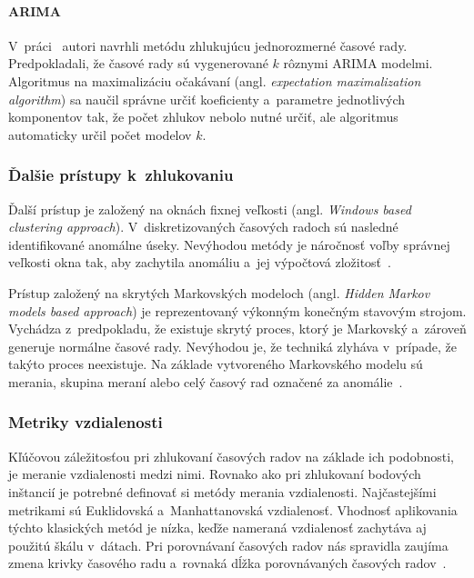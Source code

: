 \documentclass[a4paper,twoside,slovak,12pt,appendix]{article}
\begin{document}
\paragraph{ARIMA}
V~práci~\cite{Xiong2002} autori navrhli metódu zhlukujúcu jednorozmerné časové
rady. Predpokladali, že časové rady sú vygenerované $k$ rôznymi ARIMA modelmi.
Algoritmus na maximalizáciu očakávaní (angl. \textit{expectation maximalization
algorithm}) sa naučil správne určiť koeficienty a~parametre jednotlivých
komponentov tak, že počet zhlukov nebolo nutné určiť, ale algoritmus automaticky
určil počet modelov $k$.

\subsubsection{Ďalšie prístupy k~zhlukovaniu}
Ďalší prístup je založený na oknách fixnej veľkosti (angl. \textit{Windows based
clustering approach}). V~diskretizovaných časových radoch sú nasledné
identifikované anomálne úseky. Nevýhodou metódy je náročnosť voľby správnej
veľkosti okna tak, aby zachytila anomáliu a~jej výpočtová
zložitosť~\cite{Teng2010}.

Prístup založený na skrytých Markovských modeloch (angl. \textit{Hidden Markov
models based approach}) je reprezentovaný výkonným konečným stavovým strojom.
Vychádza z~predpokladu, že existuje skrytý proces, ktorý je Markovský a~zároveň
generuje normálne časové rady. Nevýhodou je, že techniká zlyháva v~prípade, že
takýto proces neexistuje. Na základe vytvoreného Markovského modelu sú merania,
skupina meraní alebo celý časový rad označené za anomálie~\cite{Teng2010}.


\subsubsection{Metriky vzdialenosti}
\label{c:distance-metrics}
Kľúčovou záležitosťou pri zhlukovaní časových radov na základe ich podobnosti,
je meranie vzdialenosti medzi nimi. Rovnako ako pri zhlukovaní bodových
inštancií je potrebné definovať si metódy merania vzdialenosti. Najčastejšími
metrikami sú Euklidovská a~Manhattanovská vzdialenosť. Vhodnosť aplikovania
týchto klasických metód je nízka, keďže nameraná vzdialenosť zachytáva aj
použitú škálu v~dátach. Pri porovnávaní časových radov nás spravidla zaujíma
zmena krivky časového radu a~rovnaká dĺžka porovnávaných časových
radov~\cite{Dzeroski2007,WarrenLiao2005}.
\end{document}
